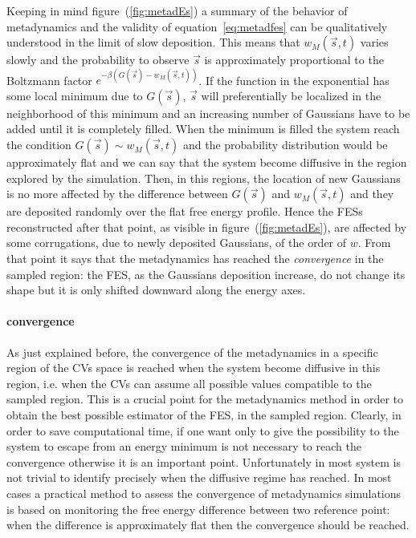 Keeping in mind figure~(\ref{fig:metadEs}) a summary of the behavior of metadynamics and the validity of equation~\eqref{eq:metadfes} can be qualitatively understood in the limit of slow deposition. This means that $w_M(\vec s, t)$ varies slowly and the probability to observe $\vec s$ is approximately proportional to the Boltzmann factor $e^{-\beta(G(\vec s) - w_M(\vec s, t))}$. If the function in the exponential has some local minimum due to $G(\vec s)$, $\vec s$ will preferentially be localized in the neighborhood of this minimum and an increasing number of Gaussians have to be added until it is completely filled. When the minimum is filled the system reach the condition $G(\vec s) \sim w_M(\vec s, t)$ and the probability distribution would be approximately flat and we can say that the system become diffusive in the region explored by the simulation. Then, in this regions, the location of new Gaussians is no more affected by the difference between $G(\vec s)$ and $w_M(\vec s, t)$ and they are deposited randomly over the flat free energy profile. Hence the \acp{FES} reconstructed after that point, as visible in figure~(\ref{fig:metadEs}), are affected by some corrugations, due to newly deposited Gaussians, of the order of $w$. From that point it says that the metadynamics has reached the \textit{convergence} in the sampled region: the \ac{FES}, as the Gaussians deposition increase, do not change its shape but it is only shifted downward along the energy axes.

\paragraph{\textbf{convergence}} As just explained before, the convergence of the metadynamics in a specific region of the \acp{CV} space is reached when the system become diffusive in this region, i.e. when the \acp{CV} can assume all possible values compatible to the sampled region. This is a crucial point for the metadynamics method in order to obtain the best possible estimator of the \ac{FES}, in the sampled region. Clearly, in order to save computational time, if one want only to give the possibility to the system to escape from an energy minimum is not necessary to reach the convergence otherwise it is an important point. Unfortunately in most system is not trivial to identify precisely when the diffusive regime has reached. In most cases a practical method to assess the convergence of metadynamics simulations is based on monitoring the free energy difference between two reference point: when the difference is approximately flat then the convergence should be reached.

